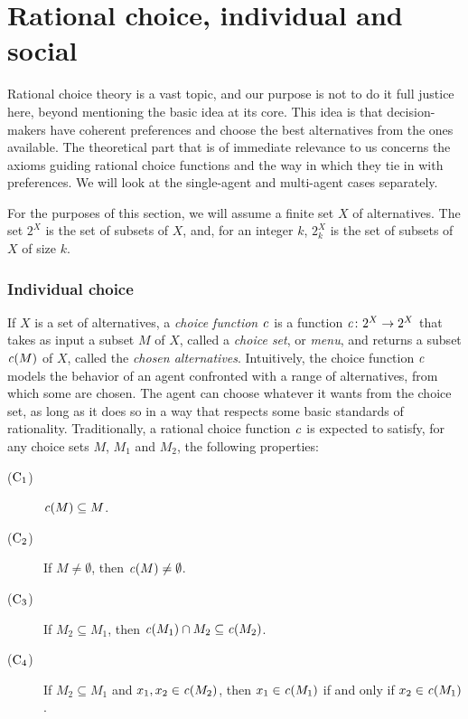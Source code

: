 \section{Rational choice, individual and social}\label{sec:2-choice-functions}
Rational choice theory is a vast topic, and our purpose 
is not to do it full justice here, beyond mentioning 
the basic idea at its core. This idea is that 
decision-makers have coherent preferences and 
choose the best alternatives from the ones available.
The theoretical part that is of immediate relevance to us
concerns the axioms guiding rational choice functions
and the way in which they tie in with preferences.
We will look at the single-agent and multi-agent cases
separately.

For the purposes of this section, we will 
assume a finite set $X$ of alternatives. 
The set $2^{X}$ is the set of
subsets of $X$, and, for an integer $k$,
$2_k^{X}$ is the set of subsets of $X$ of size $k$.

\subsubsection{Individual choice}
If $X$ is a set of alternatives,
a \emph{choice function $\mathit{c}$} is a function 
$\mathit{c}\colon 2^X\rightarrow 2^X$ 
that takes as input a subset $M$ of $X$,
called a \emph{choice set}, or \emph{menu},
and returns a subset $\mathit{c}(M)$ of $X$,
called the \emph{chosen alternatives}.
Intuitively, the choice function $\mathit{c}$ models 
the behavior of an agent confronted with a range 
of alternatives, from which some are chosen.
The agent can choose whatever it wants from the choice set,
as long as it does so in a way that respects some basic 
standards of rationality.
Traditionally, a rational choice function $\mathit{c}$ is expected to satisfy,
for any choice sets $M$, $M_1$ and $M_2$,
the following properties:
\begin{description}
	\item[($\mathrm{C}_{1}$)] $\mathit{c}(M)\subseteq M$.
	\item[($\mathrm{C}_{2}$)] If $M\neq\emptyset$, then $\mathit{c}(M)\neq\emptyset$.
	\item[($\mathrm{C}_{3}$)] If $M_2\subseteq M_1$, then $\mathit{c}(M_1)\cap M_2\subseteq \mathit{c}(M_2)$.
	\item[($\mathrm{C}_{4}$)] If $M_2\subseteq M_1$ and $x_1,x_2\in \mathit{c}(M_2)$, 
		then $x_1\in \mathit{c}(M_1)$ if and only if $x_2\in \mathit{c}(M_1)$.
\end{description}

